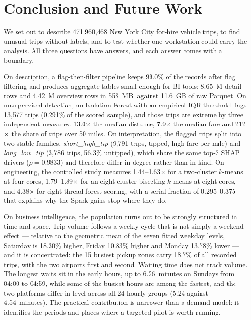 \documentclass[11pt,a4paper]{article}
\begin{document}
\section{Conclusion and Future Work}

We set out to describe 471{,}960{,}468 New York City for-hire vehicle trips, to find unusual trips without labels, and to test whether one workstation could carry the analysis. All three questions have answers, and each answer comes with a boundary.

On description, a flag-then-filter pipeline keeps 99.0\% of the records after flag filtering and produces aggregate tables small enough for BI tools: 8.65~M detail rows and 4.42~M overview rows in 558~MB, against 11.6~GB of raw Parquet. On unsupervised detection, an Isolation Forest with an empirical IQR threshold flags 13{,}577 trips (0.291\% of the scored sample), and those trips are extreme by three independent measures: 13.0$\times$ the median distance, 7.9$\times$ the median fare and 212$\times$ the share of trips over 50 miles. On interpretation, the flagged trips split into two stable families, \emph{short\_high\_tip} (9{,}791 trips, tipped, high fare per mile) and \emph{long\_low\_tip} (3{,}786 trips, 56.3\% untipped), which share the same top-3 SHAP drivers ($\rho = 0.9833$) and therefore differ in degree rather than in kind. On engineering, the controlled study measures 1.44--1.63$\times$ for a two-cluster $k$-means at four cores, 1.79--1.89$\times$ for an eight-cluster bisecting $k$-means at eight cores, and 4.38$\times$ for eight-thread forest scoring, with a serial fraction of 0.295--0.375 that explains why the Spark gains stop where they do.

On business intelligence, the population turns out to be strongly structured in time and
space. Trip volume follows a weekly cycle that is not simply a weekend effect ---
relative to the geometric mean of the seven fitted weekday levels, Saturday is 18.30\%
higher, Friday 10.83\% higher and Monday 13.78\% lower --- and it is concentrated: the 15
busiest pickup zones carry 18.7\% of all recorded trips, with the two airports first and
second. Waiting time does not track volume. The longest waits sit in the early hours, up
to 6.26~minutes on Sundays from 04:00 to 04:59, while some of the busiest hours are among
the fastest, and the two platforms differ in level across all 24 hourly groups
(5.24 against 4.54~minutes). The practical contribution is narrower than a demand model:
it identifies the periods and places where a targeted pilot is worth running.
\end{document}
